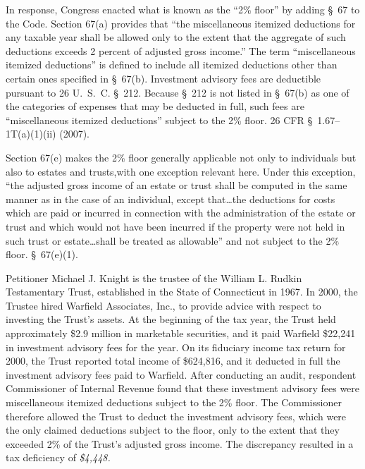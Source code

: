   In response, Congress enacted what is known as the ``2\% floor'' by adding \S~67 to the Code. Section 67(a) provides that ``the miscellaneous itemized deductions for any taxable year shall be allowed only to the extent that the aggregate of such deductions exceeds 2 percent of adjusted gross income.'' The term ``miscellaneous itemized deductions'' is defined to include all itemized deductions other than certain ones specified in \S~67(b). Investment advisory fees are deductible pursuant to 26 U.~S.~C. \S~212. Because \S~212 is not listed in \S~67(b) as one of the categories of expenses that may be deducted in full, such fees are ``miscellaneous itemized deduc\newpage tions'' subject to the 2\% floor. 26 CFR \S~1.67--1T(a)(1)(ii) (2007).

  Section 67(e) makes the 2\% floor generally applicable not only to individuals but also to estates and trusts,\footnotemark[1] with one exception relevant here. Under this exception, ``the adjusted gross income of an estate or trust shall be computed in the same manner as in the case of an individual, except that\dots the deductions for costs which are paid or incurred in connection with the administration of the estate or trust and which would not have been incurred if the property were not held in such trust or estate\dots shall be treated as allowable'' and not subject to the 2\% floor. \S~67(e)(1).

  Petitioner Michael J. Knight is the trustee of the William L. Rudkin Testamentary Trust, established in the State of Connecticut in 1967. In 2000, the Trustee hired Warfield Associates, Inc., to provide advice with respect to investing the Trust's assets. At the beginning of the tax year, the Trust held approximately \$2.9 million in marketable securities, and it paid Warfield \$22,241 in investment advisory fees for the year. On its fiduciary income tax return for 2000, the Trust reported total income of \$624,816, and it deducted in full the investment advisory fees paid to Warfield. After conducting an audit, respondent Commissioner of Internal Revenue found that these investment advisory fees were miscellaneous itemized deductions subject to the 2\% floor. The Commissioner therefore allowed the Trust to deduct the investment advisory fees, which were the only claimed deductions subject to the floor, only to the extent that they exceeded 2\% of the Trust's adjusted gross income. The discrepancy resulted in a tax deficiency of \emph{\$4,448.}

